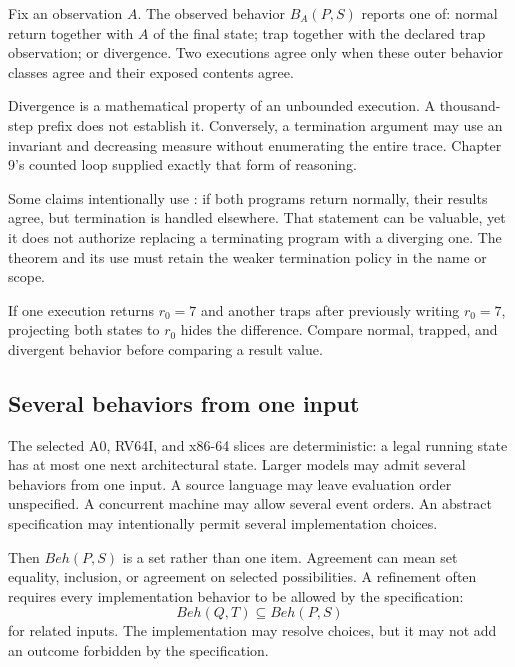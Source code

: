 \begin{definition}[title={Termination-sensitive observed behavior}]
Fix an observation \(A\). The observed behavior \(B_A(P,S)\) reports one of:
normal return together with \(A\) of the final state; trap together with the
declared trap observation; or divergence. Two executions agree only when
these outer behavior classes agree and their exposed contents agree.
\end{definition}

Divergence is a mathematical property of an unbounded execution. A thousand-
step prefix does not establish it. Conversely, a termination argument may use
an invariant and decreasing measure without enumerating the entire trace.
Chapter 9's counted loop supplied exactly that form of reasoning.

Some claims intentionally use : if both programs
return normally, their results agree, but termination is handled elsewhere.
That statement can be valuable, yet it does not authorize replacing a
terminating program with a diverging one. The theorem and its use must retain
the weaker termination policy in the name or scope.

\begin{warning}[title={A result observation must not erase behavior class}]
If one execution returns \(r_0=7\) and another traps after previously writing
\(r_0=7\), projecting both states to \(r_0\) hides the difference. Compare
normal, trapped, and divergent behavior before comparing a result value.
\end{warning}

\subsection{Several behaviors from one input}

The selected A0, RV64I, and x86-64 slices are deterministic: a legal running
state has at most one next architectural state. Larger models may admit several
behaviors from one input. A source language may leave evaluation order
unspecified. A concurrent machine may allow several event orders. An abstract
specification may intentionally permit several implementation choices.

Then \(\mathit{Beh}(P,S)\) is a set rather than one item. Agreement can mean
set equality, inclusion, or agreement on selected possibilities. A refinement
often requires every implementation behavior to be allowed by the
specification:
\[
  \mathit{Beh}(Q,T)\subseteq \mathit{Beh}(P,S)
\]
for related inputs. The implementation may resolve choices, but it may not add
an outcome forbidden by the specification.

